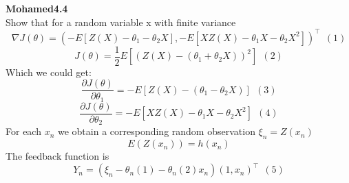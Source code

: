 \documentclass{article}
\begin{document}
\begin{comment}
\textbf {4.4}  \\
Because $$J(\theta) = \frac{1}{2}E[(Z(X)-(\theta_1+\theta_2X))^2]) \ \ (1)$$
And $$ \theta_{n+1} = \theta_n-\epsilon_n\nabla_\theta J(\theta_n)^\intercal = \theta_n+\epsilon_nE[(Z(X)-\theta_{n,1}-\theta_{n,2}X)(1,X)^\intercal] \ \ (2) $$
From (2), we notice $$ Y_n = (\xi_n-\theta_n(1)-\theta_n(2)x_n)(1,x_n)^\intercal \ \ (3)$$
$Y_n$ satisfies the Martingale difference noise model  \\
The updates $Y_n$ are random variables.  \\
For each $x_n$ we obtain a corresponding random observation $ \xi_n=Z(x_n)$ \\
The underlying process is just a sequence of iid random pairs that are statistically independent of $\theta$. Algorithm (4.1) then becomes:
$$ \theta_{n+1,1} = \theta_{n,1}-\epsilon_n(\xi_n-\theta_{n,1}-\theta_{n,2}x_n) \ \ (4)$$
$$ \theta_{n+1,2} = \theta_{n,2}-\epsilon_n(\xi_n-\theta_{n,1}-\theta_{n,2}x_n) \ \ (5)$$
From the question, 
$$ \nabla J(\theta) = (-E[Z(X)-\theta_1-\theta_2X], -E[XZ(X)-\theta_1X-\theta_2X^2])^\intercal  \ \ (6) $$
So
$$ -\nabla J(\theta) = (E[Z(X)-\theta_1-\theta_2X], E[XZ(X)-\theta_1X-\theta_2X^2])^\intercal  \ \ (7) $$

The difference between the trend and the realization is denoted by 
$$ \delta M_n = Y_n-E[Y_n|\mathfrak{F_{n-1}}] $$
Admits a Taylor approximation to $E[Y_n|\mathfrak{F_{n-1}}]$ 
$$ E[Y_n|\mathfrak{F_{n-1}}] = \frac{J(\theta_n+c_n)-J(\theta_n)}{2c_n} - \frac{J(\theta_n-c_n)-J(\theta_n)}{2c_n} $$
According to example 4.1 $$ = $$
\end{comment}



\textbf {Mohamed4.4}  \\
Show that  for a random variable x with finite variance
$$ \nabla J(\theta) = (-E[Z(X)-\theta_1-\theta_2X], -E[XZ(X)-\theta_1X-\theta_2X^2])^\intercal  \ \ (1) $$
$$J(\theta) = \frac{1}{2}E[(Z(X)-(\theta_1+\theta_2X))^2] \ \ (2)$$
Which we could get:
$$\frac{\partial J(\theta)}{\partial \theta_1} = -E[Z(X)-(\theta_1-\theta_2X)] \ \ (3) $$
$$\frac{\partial J(\theta)}{\partial \theta_2} = -E[XZ(X)-\theta_1X-\theta_2X^2]  \ \ (4)$$
For each $x_n$ we obtain a corresponding random observation $ \xi_n=Z(x_n)$ \\
$$ E(Z(x_n)) = h(x_n) $$
The feedback function is 
 $$ Y_n = (\xi_n-\theta_n(1)-\theta_n(2)x_n)(1,x_n)^\intercal \ \ (5)$$
 
\end{document}
